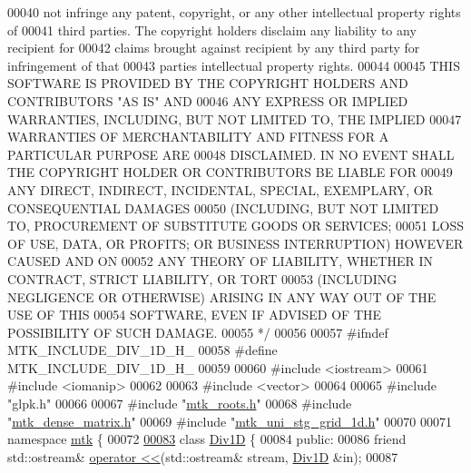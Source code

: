 \begin{DoxyCode}
00040 \textcolor{comment}{not infringe any patent, copyright, or any other intellectual property rights of}
00041 \textcolor{comment}{third parties. The copyright holders disclaim any liability to any recipient for}
00042 \textcolor{comment}{claims brought against recipient by any third party for infringement of that}
00043 \textcolor{comment}{parties intellectual property rights.}
00044 \textcolor{comment}{}
00045 \textcolor{comment}{THIS SOFTWARE IS PROVIDED BY THE COPYRIGHT HOLDERS AND CONTRIBUTORS "AS IS" AND}
00046 \textcolor{comment}{ANY EXPRESS OR IMPLIED WARRANTIES, INCLUDING, BUT NOT LIMITED TO, THE IMPLIED}
00047 \textcolor{comment}{WARRANTIES OF MERCHANTABILITY AND FITNESS FOR A PARTICULAR PURPOSE ARE}
00048 \textcolor{comment}{DISCLAIMED. IN NO EVENT SHALL THE COPYRIGHT HOLDER OR CONTRIBUTORS BE LIABLE FOR}
00049 \textcolor{comment}{ANY DIRECT, INDIRECT, INCIDENTAL, SPECIAL, EXEMPLARY, OR CONSEQUENTIAL DAMAGES}
00050 \textcolor{comment}{(INCLUDING, BUT NOT LIMITED TO, PROCUREMENT OF SUBSTITUTE GOODS OR SERVICES;}
00051 \textcolor{comment}{LOSS OF USE, DATA, OR PROFITS; OR BUSINESS INTERRUPTION) HOWEVER CAUSED AND ON}
00052 \textcolor{comment}{ANY THEORY OF LIABILITY, WHETHER IN CONTRACT, STRICT LIABILITY, OR TORT}
00053 \textcolor{comment}{(INCLUDING NEGLIGENCE OR OTHERWISE) ARISING IN ANY WAY OUT OF THE USE OF THIS}
00054 \textcolor{comment}{SOFTWARE, EVEN IF ADVISED OF THE POSSIBILITY OF SUCH DAMAGE.}
00055 \textcolor{comment}{*/}
00056 
00057 \textcolor{preprocessor}{#ifndef MTK\_INCLUDE\_DIV\_1D\_H\_}
00058 \textcolor{preprocessor}{#define MTK\_INCLUDE\_DIV\_1D\_H\_}
00059 
00060 \textcolor{preprocessor}{#include <iostream>}
00061 \textcolor{preprocessor}{#include <iomanip>}
00062 
00063 \textcolor{preprocessor}{#include <vector>}
00064 
00065 \textcolor{preprocessor}{#include "glpk.h"}
00066 
00067 \textcolor{preprocessor}{#include "\hyperlink{mtk__roots_8h}{mtk\_roots.h}"}
00068 \textcolor{preprocessor}{#include "\hyperlink{mtk__dense__matrix_8h}{mtk\_dense\_matrix.h}"}
00069 \textcolor{preprocessor}{#include "\hyperlink{mtk__uni__stg__grid__1d_8h}{mtk\_uni\_stg\_grid\_1d.h}"}
00070 
00071 \textcolor{keyword}{namespace }\hyperlink{namespacemtk}{mtk} \{
00072 
\hypertarget{mtk__div__1d_8h_source_l00083}{}\hyperlink{classmtk_1_1Div1D}{00083} \textcolor{keyword}{class }\hyperlink{classmtk_1_1Div1D}{Div1D} \{
00084  \textcolor{keyword}{public}:
00086   \textcolor{keyword}{friend} std::ostream& \hyperlink{classmtk_1_1Div1D_af3b80aac338975509618e593089e1ed9}{operator <<}(std::ostream& stream, \hyperlink{classmtk_1_1Div1D}{Div1D} &in);
00087 

\end{DoxyCode}
